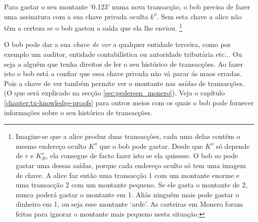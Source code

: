 Para gastar o seu montante `0.123' numa nova transacção, o bob precisa de fazer uma assinatura com a sua chave privada oculta $k^o$.
Sem esta chave a alice não têm a certeza se o bob gastou a saída que ela lhe enviou.
\footnote{Imagine-se que a alice produz duas transacções, cada uma delas contêm o mesmo endereço oculto $K^o$ que o bob pode gastar. Desde que $K^o$ só depende de $r$ e $K_B^v$, ela consegue de facto fazer isto se ela quisesse. O bob so pode gastar uma dessas saídas, porque cada endereço oculto só tem uma imagem de chave. A alice faz então uma transacção 1 com um montante enorme e uma transacção 2 com um montante pequeno. Se ele gasta o montante de 2, nunca poderá gastar o montante em 1. Aliás ninguêm mais pode gastar o dinheiro em 1, ou seja esse montante `arde'. As carteiras em Monero foram feitas para ignorar o montante mais pequeno nesta situação.}      


O bob pode dar a sua {\em chave de ver} a qualquer entidade terceira, como por exemplo um auditor, entidade contabilística ou autoridade tributária etc...
Ou seja a alguêm que tenha direitos de ler o seu histórico de transacções. Ao fazer isto o bob está a confiar que essa chave privada não vá parar ás maos erradas. Pois a chave de ver também permite ver o montante nas {\em saídas} de transacções. (O que será explicado na secção \ref{sec:pedersen_monero}). Veja o capítulo \ref{chapter:tx-knowledge-proofs} para outros meios com os quais o bob pode fornecer informações sobre o seu histórico de transacções.


